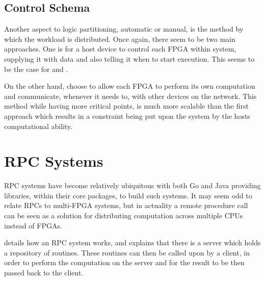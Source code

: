 \subsection{Control Schema}

Another aspect to logic partitioning, automatic or manual, is the method by which the workload is distributed. Once again, there seem to be two main approaches. One is for a host device to control each FPGA within system, supplying it with data and also telling it when to start execution. This seems to be the case for \cite{707888} and \cite{10.1145/3337821.3337846}.

On the other hand, \cite{10.1145/3020078.3021739, 10.1145/3358192, soton261305} choose to allow each FPGA to perform its own computation and communicate, whenever it needs to, with other devices on the network. This method while having more critical points, is much more scalable than the first approach which results in a constraint being put upon the system by the hosts computational ability.

\section{RPC Systems}

RPC systems have become relatively ubiquitous with both Go\cite{go-rpc} and Java\cite{java-rpc} providing libraries, within their core packages, to build such systems. It may seem odd to relate RPCs to multi-FPGA systems, but in actuality a remote procedure call can be seen as a solution for distributing computation across multiple CPUs instead of FPGAs. 

\cite{rpc-system} details how an RPC system works, and explains that there is a server which holds a repository of routines. These routines can then be called upon by a client, in order to perform the computation on the server and for the result to be then passed back to the client.